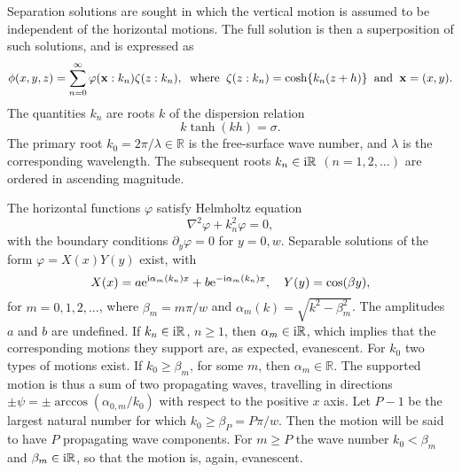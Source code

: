 \documentclass[12pt,a4paper]{article}
\newcommand{\vp}{{\phi}}
\newcommand{\vph}{{\varphi}}
\newcommand{\fp}{{\sigma}}
\newcommand{\vm}{{\zeta}}
\newcommand{\ang}{{\psi}}
\newcommand{\kx}{\alpha}
\newcommand{\ky}{\beta}
\newcommand{\bx}{{\bf x}}
\begin{document}
Separation solutions are sought in which the vertical motion is assumed to be independent of the horizontal motions.
The full solution is then a superposition of such solutions, and is expressed as
\begin{equation} 
\vp(x,y,z)
=
\sum_{n=0}^{\infty}
\vph(\bx :k_{n})
\vm(z:k_{n})
,
\;\;
\text{where}
\;\;
\vm(z:k_{n})=\cosh\{k_{n}(z+h)\}
\;\;
\text{and}
\;\;
\bx
=
(x,y).
\end{equation}
The quantities $k_{n}$ are roots $k$ of the dispersion relation
\begin{equation}
k\tanh(kh)=\fp.
\end{equation}
The primary root $k_{0}=2\pi/\lambda\in\mathbb{R}$ is the free-surface wave number, and $\lambda$ is the corresponding wavelength.
The subsequent roots $k_{n}\in{\mathrm i}\mathbb{R}$ $(n=1,2,\dots)$  are ordered in ascending magnitude.

The horizontal functions $\vph$ satisfy Helmholtz equation
\begin{equation}
\nabla^{2} 
\vph
+
k_{n}^{2}\vph
=0,
\end{equation}
with the boundary conditions $\partial_{y}\vph=0$ for $y=0,w$.
Separable solutions of the form $\vph=X(x)Y(y)$ exist, with
\begin{equation}
X(x)
=
a\exp^{\ci\kx_{m}(k_{n}) x}
+
b\exp^{-\ci\kx_{m}(k_{n}) x}
,
\quad
Y(y)
=
\cos(\ky y)
,
\end{equation}
for $m=0,1,2,\dots$, where $\ky_{m}=m\pi/w$ and $\kx_{m}(k)=\sqrt{k^{2}-\ky_{m}^{2}}$.
The amplitudes $a$ and $b$ are undefined.
If $k_{n}\in{\mathrm i}\mathbb{R}$, \ie $n\geq 1$, then $\kx_{m}\in\ci\mathbb{R}$, which implies that the corresponding motions they support are, as expected, evanescent. 
For $k_{0}$ two types of motions exist.
If $k_{0}\geq \ky_{m}$, for some $m$, then $\kx_{m}\in\mathbb{R}$. The supported motion is thus a sum of two propagating waves, travelling in directions $\pm\ang=\pm\arccos(\kx_{0,m}/k_{0})$ with respect to the positive $x$ axis.
Let $P-1$ be the largest natural number for which $k_{0}\geq \ky_{P}=P\pi/w$. Then the motion will be said to have $P$ propagating wave components.
For $m\geq P$ the wave number $k_{0}<\ky_{m}$ and $\ky_{m}\in\ci\mathbb{R}$, so that the motion is, again, evanescent.
\end{document}
